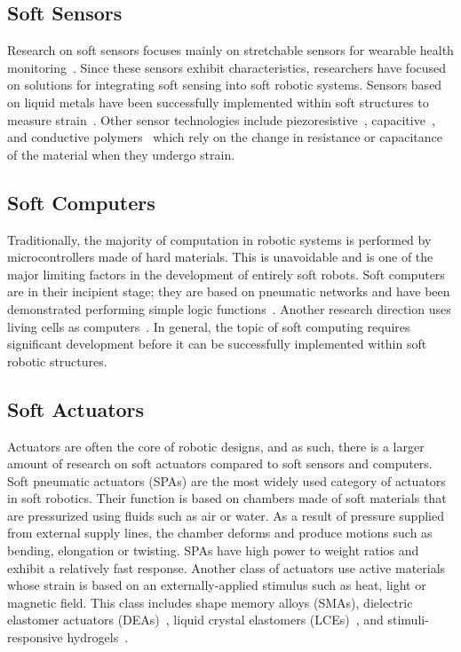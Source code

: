 \subsection{Soft Sensors}
Research on soft sensors focuses mainly on stretchable sensors for wearable health monitoring~\cite{Liu2017c,Amjadi2016a}. Since these sensors exhibit characteristics, researchers have focused on solutions for integrating soft sensing into soft robotic systems. Sensors based on liquid metals have been successfully implemented within soft structures to measure strain~\cite{Hammond2014,Chossat2013, Wang2019c,Ren2020}. Other sensor technologies include piezoresistive~\cite{Georgopoulou2020,Turgut2018,Melnykowycz2016}, capacitive~\cite{Hohimer2020,Cao2020,White2017,Frutiger2015}, and conductive polymers~\cite{Chen2021,Kanoun2021,Harito2020} which rely on the change in resistance or capacitance of the material when they undergo strain. 
\subsection{Soft Computers}
Traditionally, the majority of computation in robotic systems is performed by microcontrollers made of hard materials. This is unavoidable and is one of the major limiting factors in the development of entirely soft robots. Soft computers are in their incipient stage; they are based on pneumatic networks and have been demonstrated performing simple logic functions~\cite{Preston2019,Garrad2019}. Another research direction uses living cells as computers~\cite{Daniel2013}. In general, the topic of soft computing requires significant development before it can be successfully implemented within soft robotic structures. 
\subsection{Soft Actuators}
Actuators are often the core of robotic designs, and as such, there is a larger amount of research on soft actuators compared to soft sensors and computers. Soft pneumatic actuators (SPAs) \cite{Gorissen2017, Branyan2018} are the most widely used category of actuators in soft robotics. Their function is based on chambers made of soft materials that are pressurized using fluids such as air or water. As a result  of pressure supplied from external supply lines, the chamber deforms and produce motions such as bending, elongation or twisting. SPAs have high power to weight ratios and exhibit a relatively fast response.  Another class of actuators use active materials whose strain is based on an externally-applied stimulus such as heat, light or magnetic field. This class includes shape memory alloys (SMAs)\cite{Cianchetti2014}, dielectric elastomer actuators (DEAs)~\cite{Carpi2008,Gu2017}, liquid crystal elastomers (LCEs)~\cite{Kularatne2017,Yu2015a}, and stimuli-responsive hydrogels~\cite{Calvert2009,Liu2020,Ionov2014,Banerjee2018}. 
 
